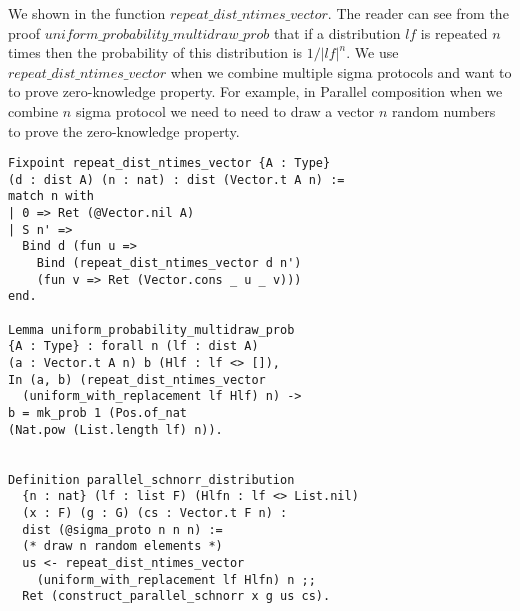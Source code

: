 \documentclass[conference,compsoc]{IEEEtran}
\begin{document}
We shown in the function $repeat\_dist\_ntimes\_vector$.
  The reader can see from the proof 
  $uniform\_probability\_multidraw\_prob$
  that if a distribution $lf$ is repeated 
  $n$ times then the probability of this distribution 
  is $1/|lf|^n$. We use $repeat\_dist\_ntimes\_vector$ 
  when we combine multiple sigma protocols and 
  want to to prove zero-knowledge property. For example, 
  in Parallel composition when we combine $n$ sigma protocol 
  we need to need to draw a vector $n$ random numbers to 
  prove the zero-knowledge property. 
  
\begin{lstlisting}[language=Coq]
Fixpoint repeat_dist_ntimes_vector {A : Type} 
(d : dist A) (n : nat) : dist (Vector.t A n) := 
match n with 
| 0 => Ret (@Vector.nil A)
| S n' => 
  Bind d (fun u => 
    Bind (repeat_dist_ntimes_vector d n')
    (fun v => Ret (Vector.cons _ u _ v)))
end.

Lemma uniform_probability_multidraw_prob 
{A : Type} : forall n (lf : dist A) 
(a : Vector.t A n) b (Hlf : lf <> []), 
In (a, b) (repeat_dist_ntimes_vector 
  (uniform_with_replacement lf Hlf) n) ->
b = mk_prob 1 (Pos.of_nat 
(Nat.pow (List.length lf) n)).


Definition parallel_schnorr_distribution  
  {n : nat} (lf : list F) (Hlfn : lf <> List.nil) 
  (x : F) (g : G) (cs : Vector.t F n) : 
  dist (@sigma_proto n n n) :=
  (* draw n random elements *)
  us <- repeat_dist_ntimes_vector 
    (uniform_with_replacement lf Hlfn) n ;;
  Ret (construct_parallel_schnorr x g us cs).
\end{lstlisting}
\end{document}
